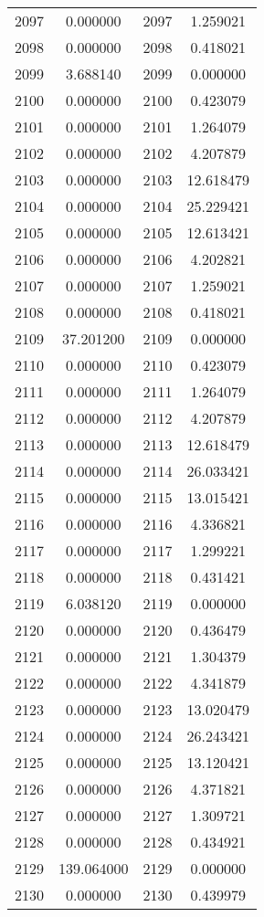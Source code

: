 \documentclass[12pt]{article}
\begin{document}
\begin{longtable}{@{}cccc@{}}
2097 & 0.000000 & 2097 & 1.259021 \\
2098 & 0.000000 & 2098 & 0.418021 \\
2099 & 3.688140 & 2099 & 0.000000 \\
2100 & 0.000000 & 2100 & 0.423079 \\
2101 & 0.000000 & 2101 & 1.264079 \\
2102 & 0.000000 & 2102 & 4.207879 \\
2103 & 0.000000 & 2103 & 12.618479 \\
2104 & 0.000000 & 2104 & 25.229421 \\
2105 & 0.000000 & 2105 & 12.613421 \\
2106 & 0.000000 & 2106 & 4.202821 \\
2107 & 0.000000 & 2107 & 1.259021 \\
2108 & 0.000000 & 2108 & 0.418021 \\
2109 & 37.201200 & 2109 & 0.000000 \\
2110 & 0.000000 & 2110 & 0.423079 \\
2111 & 0.000000 & 2111 & 1.264079 \\
2112 & 0.000000 & 2112 & 4.207879 \\
2113 & 0.000000 & 2113 & 12.618479 \\
2114 & 0.000000 & 2114 & 26.033421 \\
2115 & 0.000000 & 2115 & 13.015421 \\
2116 & 0.000000 & 2116 & 4.336821 \\
2117 & 0.000000 & 2117 & 1.299221 \\
2118 & 0.000000 & 2118 & 0.431421 \\
2119 & 6.038120 & 2119 & 0.000000 \\
2120 & 0.000000 & 2120 & 0.436479 \\
2121 & 0.000000 & 2121 & 1.304379 \\
2122 & 0.000000 & 2122 & 4.341879 \\
2123 & 0.000000 & 2123 & 13.020479 \\
2124 & 0.000000 & 2124 & 26.243421 \\
2125 & 0.000000 & 2125 & 13.120421 \\
2126 & 0.000000 & 2126 & 4.371821 \\
2127 & 0.000000 & 2127 & 1.309721 \\
2128 & 0.000000 & 2128 & 0.434921 \\
2129 & 139.064000 & 2129 & 0.000000 \\
2130 & 0.000000 & 2130 & 0.439979 \\

\end{longtable}
\end{document}
